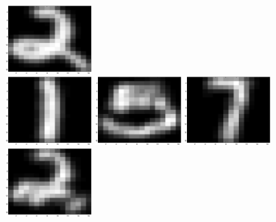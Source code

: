 \documentclass{article}
\begin{document}
\includegraphics[width=0.25\textwidth]{50digits8.eps}\\[1em]
\includegraphics[width=0.25\textwidth]{50reconst5.eps}\hspace{0.03\textwidth}%
\includegraphics[width=0.25\textwidth]{50reconst6.eps}\hspace{0.03\textwidth}%
\includegraphics[width=0.25\textwidth]{50reconst7.eps}\hspace{0.03\textwidth}%
\includegraphics[width=0.25\textwidth]{50reconst8.eps}\\[4em]
\newpage
\end{document}
